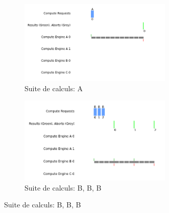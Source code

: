 \documentclass{article}
\begin{document}
\begin{figure}[h]
    \begin{subfigure}{0.45\textwidth}
        \centering
        \includegraphics[width=0.8\textwidth]{figures/A}
        \caption{Suite de calculs: A}
    \end{subfigure}
    \begin{subfigure}{0.45\textwidth}
        \centering
        \includegraphics[width=0.8\textwidth]{figures/B_B_B}
        \caption{Suite de calculs: B, B, B}
    \end{subfigure}


\end{figure}
\end{document}
